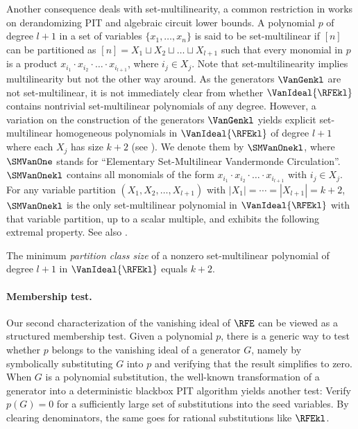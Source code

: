 \documentclass{toc}
\begin{document}
Another consequence deals with set-multilinearity, a common restriction in works on derandomizing PIT
and algebraic circuit lower bounds.
A polynomial $p$ of degree $l+1$ in a set of variables
$\{x_1,\ldots,x_n\}$ is said to be set-multilinear
if $[n]$ can be partitioned as
$[n] = X_1 \sqcup X_2 \sqcup \dots \sqcup X_{l+1}$
such that every monomial in $p$ is a product
$x_{i_1}\cdot x_{i_2} \cdot \dots \cdot x_{i_{l+1}}$,
where $i_j \in X_j$.
Note that set-multilinearity implies multilinearity but not the other
way around.
As the generators $\VanGenkl$ are not set-multilinear,
it is not immediately clear from 
whether $\VanIdeal{\RFEkl}$ contains nontrivial set-multilinear
polynomials of any degree.
However, a variation on the construction of the generators $\VanGenkl$
yields explicit set-multilinear homogeneous polynomials in
\(\VanIdeal{\RFEkl}\) of degree $l+1$ where each \(X_j\) has size $k+2$ (see ).
We denote them by $\SMVanOnekl$, where $\SMVanOne$ stands for
``Elementary Set-Multilinear Vandermonde Circulation''.
$\SMVanOnekl$ contains all monomials of the form
$x_{i_1}\cdot x_{i_2} \cdot \dots \cdot x_{i_{l+1}}$ with $i_j \in X_j$.
For any variable partition $(X_1, X_2, \dots, X_{l+1})$ with
$|X_1| = \cdots = |X_{l+1}| = k+2$,
$\SMVanOnekl$ is the only set-multilinear polynomial in $\VanIdeal{\RFEkl}$
with that variable partition, up to a scalar multiple, and exhibits the following extremal property. See also .
\begin{corollary}
    \label{cor.rfe.partition-class-size}
    The minimum {\em partition class size} of a nonzero set-multilinear
    polynomial of degree $l+1$ in $\VanIdeal{\RFEkl}$ equals $k+2$.
\end{corollary}

\paragraph{Membership test.}
Our second characterization of the vanishing ideal of $\RFE$ can be viewed as
a structured membership test.
Given a polynomial \(p\),
there is a generic way to test whether \(p\) belongs to the
vanishing ideal of a generator $G$,
namely by symbolically substituting \(G\) into \(p\) and verifying that the
result simplifies to zero.
When $G$ is a polynomial substitution,
the well-known transformation of a generator into a deterministic blackbox PIT
algorithm 
yields another test:
Verify \(p(G)=0\) for a sufficiently large set of substitutions into the seed
variables.
By clearing denominators,
the same goes for rational substitutions like $\RFEkl$.
\end{document}
